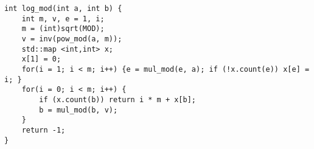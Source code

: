 \begin{lstlisting}
int log_mod(int a, int b) {
	int m, v, e = 1, i;
	m = (int)sqrt(MOD);
	v = inv(pow_mod(a, m));
	std::map <int,int> x;
	x[1] = 0;
	for(i = 1; i < m; i++) {e = mul_mod(e, a); if (!x.count(e)) x[e] = i; }
	for(i = 0; i < m; i++) {
		if (x.count(b)) return i * m + x[b];
		b = mul_mod(b, v);
	}
	return -1;
}
\end{lstlisting}
